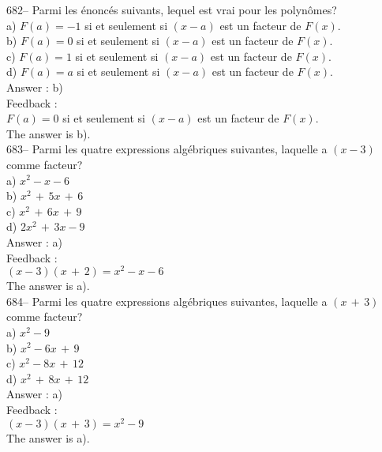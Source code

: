 ﻿\documentclass[letterpaper, 12pt]{article}
\begin{document}
682-- Parmi les \'enonc\'es suivants, lequel est vrai pour les polyn\^omes?\\
a)  $F\left( a\right) = -1$ si et seulement si $\left( x-a\right) $
est un
facteur de $F\left( x\right) $.\\
b) $ F\left( a\right) = 0 $ si et seulement si $ \left( x-a\right) $
est un facteur
de $F\left( x\right) $.\\
c) $ F\left( a\right) = 1 $ si et seulement si $ \left( x-a\right) $
est un facteur
de $F\left( x\right) $.\\
d) $ F\left( a\right) = a $ si et seulement si $ \left( x-a\right) $
est un facteur
de $F\left( x\right) $.\\

Answer : b)\\

Feedback : \\
$ F\left( a\right) = 0 $ si et seulement si $ \left( x-a\right) $
est un facteur de
$F\left( x\right) $.\\
The answer is b).\\

683-- Parmi les quatre expressions alg\'ebriques suivantes, laquelle a
$\left( x-3\right)$ comme facteur?\\
a) $x^{2}-x-6$\\
b) $x^{2}\,+\,5x\,+\,6$\\
c) $x^{2}\,+\,6x\,+\,9$\\
d) $2x^{2}\,+\,3x-9$\\

Answer : a)\\

Feedback : \\
$(x-3)(x\,+\,2)=x^{2}-x-6$\\
The answer is a).\\

684-- Parmi les quatre expressions alg\'ebriques suivantes, laquelle a
$\left( x\,+\,3\right) $ comme facteur?\\
a) $x^{2}-9$\\
b) $x^{2}-6x\,+\,9$\\
c) $x^{2}-8x\,+\,12$\\
d) $x^{2}\,+\,8x\,+\,12$\\

Answer : a)\\

Feedback : \\
$\left( x-3\right) \left( x\,+\,3\right) = x^{2}-9$\\
The answer is a).\\
\end{document}

